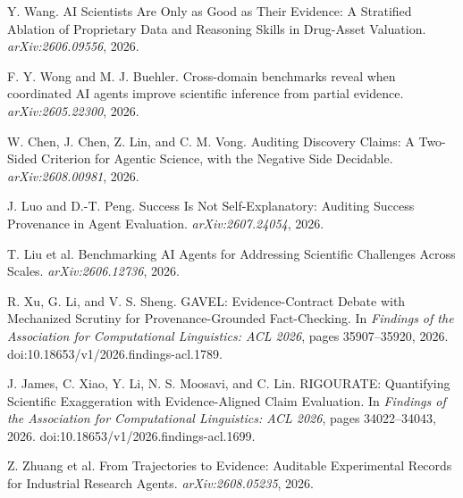 Y. Wang. AI Scientists Are Only as Good as Their Evidence: A Stratified Ablation of Proprietary Data and Reasoning Skills in Drug-Asset Valuation. \emph{arXiv:2606.09556}, 2026.

F. Y. Wong and M. J. Buehler. Cross-domain benchmarks reveal when coordinated AI agents improve scientific inference from partial evidence. \emph{arXiv:2605.22300}, 2026.

W. Chen, J. Chen, Z. Lin, and C. M. Vong. Auditing Discovery Claims: A Two-Sided Criterion for Agentic Science, with the Negative Side Decidable. \emph{arXiv:2608.00981}, 2026.

J. Luo and D.-T. Peng. Success Is Not Self-Explanatory: Auditing Success Provenance in Agent Evaluation. \emph{arXiv:2607.24054}, 2026.

T. Liu et al. Benchmarking AI Agents for Addressing Scientific Challenges Across Scales. \emph{arXiv:2606.12736}, 2026.

R. Xu, G. Li, and V. S. Sheng. GAVEL: Evidence-Contract Debate with Mechanized Scrutiny for Provenance-Grounded Fact-Checking. In \emph{Findings of the Association for Computational Linguistics: ACL 2026}, pages 35907--35920, 2026. doi:10.18653/v1/2026.findings-acl.1789.

J. James, C. Xiao, Y. Li, N. S. Moosavi, and C. Lin. RIGOURATE: Quantifying Scientific Exaggeration with Evidence-Aligned Claim Evaluation. In \emph{Findings of the Association for Computational Linguistics: ACL 2026}, pages 34022--34043, 2026. doi:10.18653/v1/2026.findings-acl.1699.

Z. Zhuang et al. From Trajectories to Evidence: Auditable Experimental Records for Industrial Research Agents. \emph{arXiv:2608.05235}, 2026.
